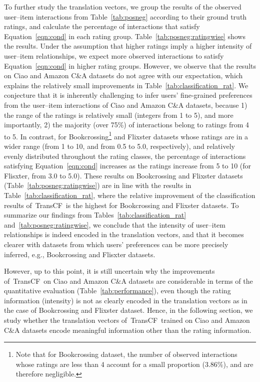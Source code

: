 \documentclass[conference]{IEEEtran}
\newcommand{\propose}{\textsf{{TransCF}}}
\begin{document}
To further study the translation vectors,
we group the results of the observed user--item interactions from Table~\ref{tab:posneg} according to their ground truth ratings, and calculate the percentage of interactions that satisfy Equation~\ref{eqn:cond} in each rating group.
Table~\ref{tab:posneg:ratingwise} shows the results. 
Under the assumption that higher ratings imply a higher intensity of user--item relationships, we expect more observed interactions to satisfy Equation~\ref{eqn:cond} in higher rating groups.
However, we observe that the results on Ciao and Amazon C\&A datasets do not agree with our expectation, which explains the relatively small improvements in Table~\ref{tab:classification_rat}. We conjecture that it is inherently challenging to infer users' fine-grained preferences from the user--item interactions of Ciao and Amazon C\&A datasets, because 1) the range of the ratings is relatively small (integers from 1 to 5), and more importantly, 2) the majority (over 75\%) of interactions belong to ratings from 4 to 5.
In contrast, for Bookcrossing\footnote{Note that for Bookcrossing dataset, the number of observed interactions whose ratings are less than 4 account for a small proportion (3.86\%), and are therefore negligible.} and Flixster datasets whose ratings are in a wider range (from 1 to 10, and from 0.5 to 5.0, respectively), and relatively evenly distributed throughout the rating classes, the percentage of interactions satisfying Equation~\ref{eqn:cond} increases as the ratings increase from 5 to 10 (for Flisxter, from 3.0 to 5.0). These results on Bookcrossing and Flixster datasets (Table~\ref{tab:posneg:ratingwise}) are in line with the results in Table~\ref{tab:classification_rat}, where the relative improvement of the classification results of~\propose~is the highest for Bookcrossing and Flixster datasets.
To summarize our findings from Tables~\ref{tab:classification_rat} and~\ref{tab:posneg:ratingwise}, 
we conclude that the intensity of user--item relationships is indeed encoded in the translation vectors, and that it becomes clearer with datasets from which users' preferences can be more precisely inferred, e.g., Bookcrossing and Flisxter datasets.



However, up to this point, it is still uncertain why the improvements of~\propose~on Ciao and Amazon C\&A datasets are considerable in terms of the quantitative evaluation (Table~\ref{tab:performance}), even though the rating information (intensity) is not as clearly encoded in the translation vectors as in the case of Bookcrossing and Flixster dataset. 
Hence, in the following section, we study whether the translation vectors of~\propose~trained on Ciao and Amazon C\&A datasets encode meaningful information other than the rating information. 
\end{document}
